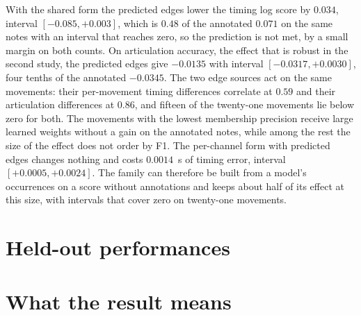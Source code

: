With the shared form the predicted edges lower the timing log score by
$0.034$, interval $[-0.085, +0.003]$, which is $0.48$ of the annotated
$0.071$ on the same notes with an interval that reaches zero, so the
prediction is not met, by a small margin on both counts. On articulation
accuracy, the effect that is robust in the second study, the predicted
edges give $-0.0135$ with interval $[-0.0317, +0.0030]$, four tenths of
the annotated $-0.0345$. The two edge sources act on the same movements:
their per-movement timing differences correlate at $0.59$ and their
articulation differences at $0.86$, and fifteen of the twenty-one
movements lie below zero for both. The movements with the lowest
membership precision receive large learned weights without a gain on the
annotated notes, while among the rest the size of the effect does not
order by F1. The per-channel form with predicted edges changes nothing and
costs $0.0014$~s of timing error, interval $[+0.0005, +0.0024]$. The
family can therefore be built from a model's occurrences on a score
without annotations and keeps about half of its effect at this size, with
intervals that cover zero on twenty-one movements.

\section{Held-out performances}\label{sec:motif-heldout}

\section{What the result means}\label{sec:motif-meaning}

